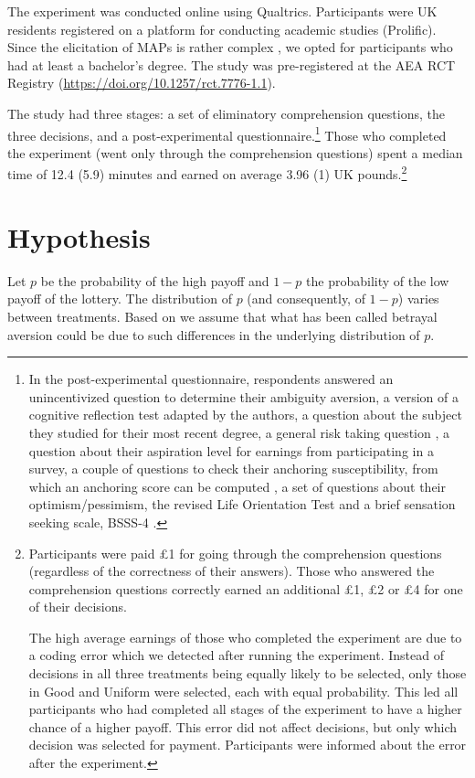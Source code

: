The experiment was conducted online using Qualtrics.
Participants were UK residents registered on a platform for conducting academic studies (Prolific).
Since the elicitation of MAPs is rather complex \citep{Quercia2016,Polipciuc2022inout}, we opted for participants who had at least a bachelor's degree.
The study was pre-registered at the AEA RCT Registry (\url{https://doi.org/10.1257/rct.7776-1.1}).

The study had three stages: a set of eliminatory comprehension questions, the three decisions, and a post-experimental questionnaire.\footnote{
In the post-experimental questionnaire, respondents answered an unincentivized question to determine their ambiguity aversion, a version of a cognitive reflection test \citep{Frederick2005,Thomson2016} adapted by the authors, a question about the subject they studied for their most recent degree, a general risk taking question \citep{Dohmen2011}, a question about their aspiration level for earnings from participating in a survey, a couple of questions to check their anchoring susceptibility, from which an anchoring score can be computed \citep{Cheek2017}, a set of questions about their optimism/pessimism, the revised Life Orientation Test \citep{Scheier1994} and a brief sensation seeking scale, BSSS-4 \citep{Stephenson2003}.
}
Those who completed the experiment (went only through the comprehension questions) spent a median time of 12.4 (5.9) minutes and earned on average 3.96 (1) UK pounds.\footnote{
Participants were paid \pounds1 for going through the comprehension questions (regardless of the correctness of their answers).
Those who answered the comprehension questions correctly earned an additional \pounds1, \pounds2 or \pounds4 for one of their decisions.

The high average earnings of those who completed the experiment are due to a coding error which we detected after running the experiment.
Instead of decisions in all three treatments being equally likely to be selected, only those in Good and Uniform were selected, each with equal probability.
This led all participants who had completed all stages of the experiment to have a higher chance of a higher payoff.
This error did not affect decisions, but only which decision was selected for payment.
Participants were informed about the error after the experiment.
}



\section{Hypothesis}\label{sec:hyp}
Let $p$ be the probability of the high payoff and $1-p$ the probability of the low payoff of the lottery.
The distribution of $p$ (and consequently, of $1-p$) varies between treatments.
Based on \cite{Li2020a} we assume that what has been called betrayal aversion could be due to such differences in the underlying distribution of $p$.

